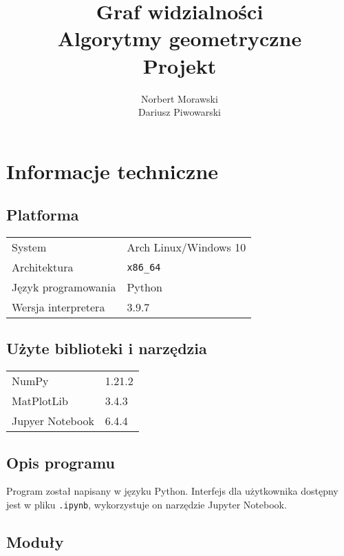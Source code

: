 \documentclass[12pt]{article}
\begin{document}
	
	\title{Graf widzialności \\
		\vspace{0.2cm}
		\large Algorytmy geometryczne \\
		\large Projekt}
	\author{Norbert Morawski\\Dariusz Piwowarski}
	
	\maketitle
	\tableofcontents
	\pagebreak
	
	\section{Informacje techniczne}
	\subsection{Platforma}
		\begin{tabular}{l|l}
			System&Arch Linux/Windows 10\\
			Architektura&\texttt{x86\_64}\\
			Język programowania&Python\\
			Wersja interpretera&3.9.7\\
		\end{tabular}

	\subsection{Użyte biblioteki i narzędzia}
		\begin{tabular}{l|l}
			NumPy&1.21.2\\
			MatPlotLib&3.4.3\\
			Jupyer Notebook&6.4.4
		\end{tabular}
	
	\subsection{Opis programu}
		Program został napisany w języku Python. Interfejs dla użytkownika dostępny jest w pliku \lstinline|.ipynb|, wykorzystuje on narzędzie Jupyter Notebook.
	
	\subsection{Moduły}
\end{document}
